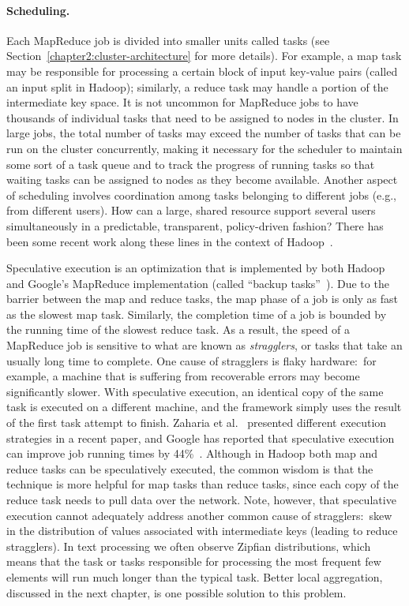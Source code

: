 \paragraph{Scheduling.} Each MapReduce job is divided into smaller
units called tasks (see Section~\ref{chapter2:cluster-architecture}
for more details).  For example, a map task may be responsible for
processing a certain block of input key-value pairs (called an input
split in Hadoop); similarly, a reduce task may handle a portion of the
intermediate key space.  It is not uncommon for MapReduce jobs to have
thousands of individual tasks that need to be assigned to nodes in the
cluster.  In large jobs, the total number of tasks may exceed the
number of tasks that can be run on the cluster concurrently, making it
necessary for the scheduler to maintain some sort of a task queue and
to track the progress of running tasks so that waiting tasks can be
assigned to nodes as they become available.  Another aspect of
scheduling involves coordination among tasks belonging to different
jobs (e.g., from different users).  How can a large, shared resource
support several users simultaneously in a predictable, transparent,
policy-driven fashion?  There has been some recent work along these
lines in the context of
Hadoop~\cite{Sandholm_Lai_2009,Zaharia_etal_2009}.

Speculative execution is an optimization that is implemented by both
Hadoop and Google's MapReduce implementation (called ``backup
tasks''~\cite{Dean_Ghemawat_OSDI2004}).  Due to the barrier between
the map and reduce tasks, the map phase of a job is only as fast as
the slowest map task.  Similarly, the completion time of a job is
bounded by the running time of the slowest reduce task.  As a result,
the speed of a MapReduce job is sensitive to what are known as {\it
stragglers}, or tasks that take an usually long time to complete.  One
cause of stragglers is flaky hardware:\ for example, a machine that is
suffering from recoverable errors may become significantly slower.
With speculative execution, an identical copy of the same task is
executed on a different machine, and the framework simply uses the
result of the first task attempt to finish.  Zaharia et
al.~\cite{Zaharia_etal_OSDI2008} presented different execution
strategies in a recent paper, and Google has reported that speculative
execution can improve job running times by
44\%~\cite{Dean_Ghemawat_OSDI2004}.  Although in Hadoop both map and
reduce tasks can be speculatively executed, the common wisdom is that
the technique is more helpful for map tasks than reduce tasks, since
each copy of the reduce task needs to pull data over the network.
Note, however, that speculative execution cannot adequately address
another common cause of stragglers:\ skew in the distribution of
values associated with intermediate keys (leading to reduce
stragglers).  In text processing we often observe Zipfian
distributions, which means that the task or tasks responsible for
processing the most frequent few elements will run much longer than
the typical task.  Better local aggregation, discussed in the next
chapter, is one possible solution to this problem.

